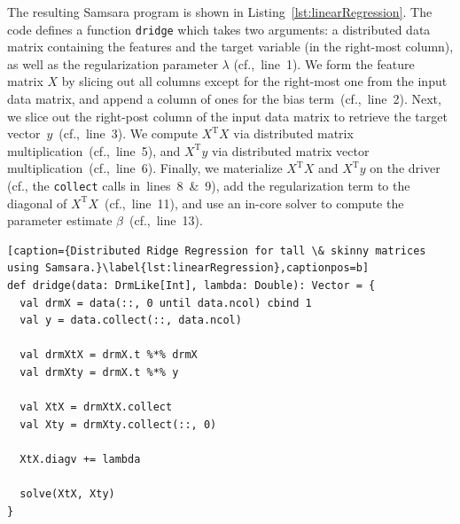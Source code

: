 \documentclass{article}
\begin{document}
The resulting Samsara program is shown in Listing~\ref{lst:linearRegression}. The code defines a function \texttt{dridge} which takes two arguments: a distributed data matrix containing the features and the target variable (in the right-most column), as well as the regularization parameter $\lambda$ (cf.,~line~1). We form the feature matrix $X$ by slicing out all columns except for the right-most one from the input data matrix, and append a column of ones for the bias term~(cf.,~line~2). Next, we slice out the right-post column of the input data matrix to retrieve the target vector~$y$~(cf.,~line~3). We compute $X^\mathrm{T} X$ via distributed matrix multiplication~(cf.,~line~5), and $X^\mathrm{T}y$ via distributed matrix vector multiplication~(cf.,~line~6). Finally, we materialize $X^\mathrm{T} X$  and $X^\mathrm{T} y$ on the driver (cf., the \texttt{collect} calls in~lines~8~\&~9), add the regularization term to the diagonal of $X^\mathrm{T} X$~(cf.,~line~11), and use an in-core solver to compute the parameter estimate $\beta$~(cf.,~line~13).

\begin{lstlisting}[caption={Distributed Ridge Regression for tall \& skinny matrices using Samsara.}\label{lst:linearRegression},captionpos=b] 
def dridge(data: DrmLike[Int], lambda: Double): Vector = {
  val drmX = data(::, 0 until data.ncol) cbind 1
  val y = data.collect(::, data.ncol)

  val drmXtX = drmX.t %*% drmX
  val drmXty = drmX.t %*% y

  val XtX = drmXtX.collect 
  val Xty = drmXty.collect(::, 0) 

  XtX.diagv += lambda

  solve(XtX, Xty)
}
\end{lstlisting}
\end{document}

